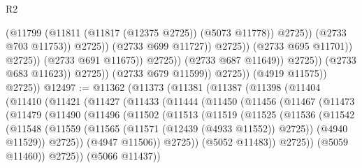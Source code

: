 \begin{lexlean}{R2}
\begin{coremodule}
                                                      (@11799
                                                        (@11811
                                                          (@11817 (@12375 @2725))
                                                          (@5073 @11778))
                                                        @2725))
                                                    (@2733 @703 @11753))
                                                  @2725))
                                              (@2733 @699 @11727))
                                            @2725))
                                        (@2733 @695 @11701))
                                      @2725))
                                  (@2733 @691 @11675))
                                @2725))
                            (@2733 @687 @11649))
                          @2725))
                      (@2733 @683 @11623))
                    @2725))
                (@2733 @679 @11599))
              @2725))
          (@4919 @11575))
        @2725))
@12497 := @11362
    (@11373
      (@11381
        (@11387
          (@11398
            (@11404
              (@11410
                (@11421
                  (@11427
                    (@11433
                      (@11444
                        (@11450
                          (@11456
                            (@11467
                              (@11473
                                (@11479
                                  (@11490
                                    (@11496
                                      (@11502
                                        (@11513
                                          (@11519
                                            (@11525
                                              (@11536
                                                (@11542
                                                  (@11548
                                                    (@11559
                                                      (@11565
                                                        (@11571 (@12439 (@4933 @11552)) @2725))
                                                      (@4940 @11529))
                                                    @2725))
                                                (@4947 @11506))
                                              @2725))
                                          (@5052 @11483))
                                        @2725))
                                    (@5059 @11460))
                                  @2725))
                              (@5066 @11437))

\end{coremodule}
\end{lexlean}
